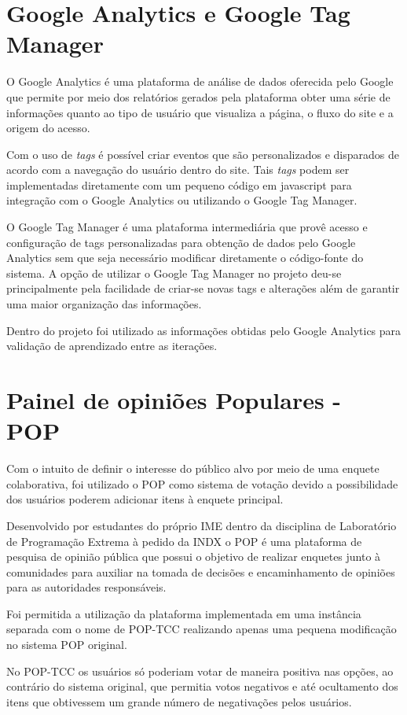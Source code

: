 \section{Google Analytics e Google Tag Manager}
\par O Google Analytics é uma plataforma de análise de dados oferecida pelo Google que permite por meio dos relatórios gerados pela plataforma obter uma série de informações quanto ao tipo de usuário que visualiza a página, o fluxo do site e a origem do acesso.
\par Com o uso de \emph{tags} é possível criar eventos que são personalizados e disparados de acordo com a navegação do usuário dentro do site. Tais \emph{tags} podem ser implementadas diretamente com um pequeno código em javascript para integração com o Google Analytics ou utilizando o Google Tag Manager.
\par O Google Tag Manager é uma plataforma intermediária que provê acesso e configuração de tags personalizadas para obtenção de dados pelo Google Analytics sem que seja necessário modificar diretamente o código-fonte do sistema. A opção de utilizar o Google Tag Manager no projeto deu-se principalmente pela facilidade de criar-se novas tags e alterações além de garantir uma maior organização das informações.
\par Dentro do projeto foi utilizado as informações obtidas pelo Google Analytics para validação de aprendizado entre as iterações.

\section{Painel de opiniões Populares - POP}
\par Com o intuito de definir o interesse do público alvo por meio de uma enquete colaborativa, foi utilizado o POP como sistema de votação devido a possibilidade dos usuários poderem adicionar itens à enquete principal.
\par Desenvolvido por estudantes do próprio IME dentro da disciplina de Laboratório de Programação Extrema à pedido da INDX o POP é uma plataforma de pesquisa de opinião pública que possui o objetivo de realizar enquetes junto à comunidades para auxiliar na tomada de decisões e encaminhamento de opiniões para as autoridades responsáveis.
\par Foi permitida a utilização da plataforma implementada em uma instância separada com o nome de POP-TCC realizando apenas uma pequena modificação no sistema POP original.
\par No POP-TCC os usuários só poderiam votar de maneira positiva nas opções, ao contrário do sistema original, que permitia votos negativos e até ocultamento dos itens que obtivessem um grande número de negativações pelos usuários.


